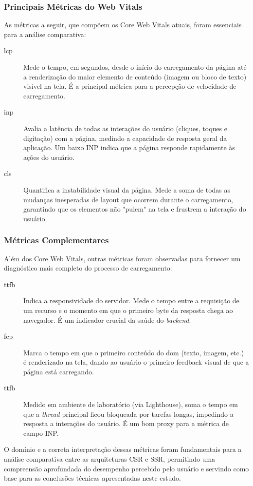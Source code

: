 \subsubsection{Principais Métricas do Web Vitals}
As métricas a seguir, que compõem os Core Web Vitals atuais, foram essenciais para a análise comparativa:
\begin{description}
    \item[\acrfull{lcp}] Mede o tempo, em segundos, desde o início do carregamento da página até a renderização do maior elemento de conteúdo (imagem ou bloco de texto) visível na tela. É a principal métrica para a percepção de velocidade de carregamento.
    \item[\acrfull{inp}] Avalia a latência de todas as interações do usuário (cliques, toques e digitação) com a página, medindo a capacidade de resposta geral da aplicação. Um baixo INP indica que a página responde rapidamente às ações do usuário.
    \item[\acrfull{cls}] Quantifica a instabilidade visual da página. Mede a soma de todas as mudanças inesperadas de layout que ocorrem durante o carregamento, garantindo que os elementos não "pulem" na tela e frustrem a interação do usuário.
\end{description}

\subsubsection{Métricas Complementares}
Além dos Core Web Vitals, outras métricas foram observadas para fornecer um diagnóstico mais completo do processo de carregamento:
\begin{description}
    \item[\acrfull{ttfb}] Indica a responsividade do servidor. Mede o tempo entre a requisição de um recurso e o momento em que o primeiro byte da resposta chega ao navegador. É um indicador crucial da saúde do \textit{backend}.
    \item[\acrfull{fcp}] Marca o tempo em que o primeiro conteúdo do \acrshort{dom} (texto, imagem, etc.) é renderizado na tela, dando ao usuário o primeiro feedback visual de que a página está carregando.
    \item[\acrfull{ttfb}] Medido em ambiente de laboratório (via Lighthouse), soma o tempo em que a \textit{thread} principal ficou bloqueada por tarefas longas, impedindo a resposta a interações do usuário. É um bom proxy para a métrica de campo INP.
\end{description}
O domínio e a correta interpretação dessas métricas foram fundamentais para a análise comparativa entre as arquiteturas CSR e SSR, permitindo uma compreensão aprofundada do desempenho percebido pelo usuário e servindo como base para as conclusões técnicas apresentadas neste estudo.


